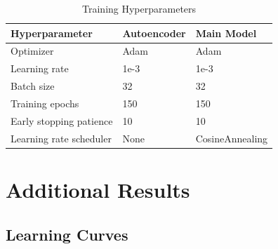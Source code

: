 \begin{table}[h]
    \centering
    \caption{Training Hyperparameters}
    \begin{tabular}{lll}
        \toprule
        Hyperparameter          & Autoencoder & Main Model      \\
        \midrule
        Optimizer               & Adam        & Adam            \\
        Learning rate           & 1e-3        & 1e-3            \\
        Batch size              & 32          & 32              \\
        Training epochs         & 150         & 150             \\
        Early stopping patience & 10          & 10              \\
        Learning rate scheduler & None        & CosineAnnealing \\
        \bottomrule
    \end{tabular}
\end{table}

\section{Additional Results}

\subsection{Learning Curves}

